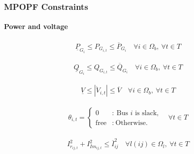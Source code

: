 \documentclass[
	11pt, %
	aspectratio=169, %
]{beamer}
\begin{document}
\begin{frame}
	\frametitle{MPOPF Constraints}
	\framesubtitle{Power and voltage} %

	\vspace{-1.2em}

	\begin{align}
	\label{eq:Mcons_power_P}
		\underline{P}_{G_{i}} \leq P_{G_{i,t}} \leq \overline{P}_{G_{i}}  \quad \forall i \in \Omega_{b},\ \forall t \in T
	\end{align}

	\begin{align}
	\label{eq:Mcons_power_Q}
		\underline{Q}_{G_{i}} \leq Q_{G_{i,t}} \leq \overline{Q}_{G_{i}}  \quad \forall i \in \Omega_{b},\ \forall t \in T
	\end{align}

	\begin{align}
	\label{eq:Mcons_voltage}
		\underline{V} \leq \left|\dot{V}_{i,t} \right| \leq \overline{V}  \quad \forall i \in \Omega_{b},\ \forall t \in T
	\end{align}

	\begin{align}
	\label{eq:Mcons_slack}
		\theta_{i,t} = \left\{ \begin{array}{cl}
							0 & : \ \text{Bus } i \text{ is slack,} \\
							\text{free} & : \ \text{Otherwise.}
							\end{array} \right. \quad \forall t \in T
	\end{align}

	\begin{align}
	\label{eq:Mcons_current}
		I_{r_{ij,t}}^{2}+ I_{Im_{ij,t}}^{2} \leq \overline{I}_{ij}^{2} \quad   \forall l(ij) \in \Omega_{l},\ \forall t \in T
	\end{align}


\end{frame}

\end{document}
